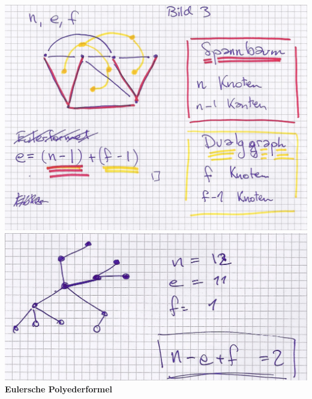 \begin{bsp}[note = Verbindungen ohne Überkreuzen]
\begin{bew}[head = Beweisidee:]
		\includegraphics[width=\textwidth]{Bild4} \\
		\includegraphics[width=\textwidth]{Bild5} \\
		\textbf{Eulersche Polyederformel}
	\end{bew}
\end{bsp}
